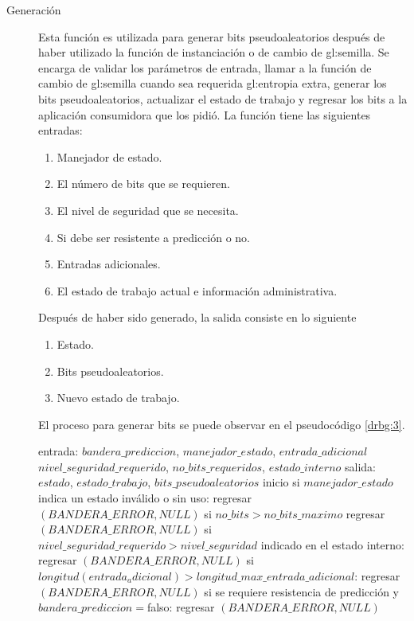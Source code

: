 \begin{description}
  \item [Generación] Esta función es utilizada para generar bits
    pseudoaleatorios después de haber utilizado la función de instanciación o
    de cambio de \gls{gl:semilla}. Se encarga de validar los parámetros de
    entrada, llamar a la función de cambio de \gls{gl:semilla} cuando sea
    requerida \gls{gl:entropia} extra, generar los bits pseudoaleatorios,
    actualizar el estado de trabajo y regresar los bits a la aplicación
    consumidora que los pidió. La función tiene las siguientes entradas:
    \begin{enumerate}
      \item Manejador de estado.
      \item El número de bits que se requieren.
      \item El nivel de seguridad que se necesita.
      \item Si debe ser resistente a predicción o no.
      \item Entradas adicionales.
      \item El estado de trabajo actual e información administrativa.
    \end{enumerate}
    Después de haber sido generado, la salida consiste en lo siguiente
    \begin{enumerate}
      \item Estado.
      \item Bits pseudoaleatorios.
      \item Nuevo estado de trabajo.
    \end{enumerate}
    El proceso para generar bits se puede observar en el pseudocódigo
    \ref{drbg:3}.
\begin{pseudocodigo}[caption={DRBG, generación.}, label={drbg:3}]
    entrada:  $bandera\_prediccion$, $manejador\_estado$, $entrada\_adicional$
              $nivel\_seguridad\_requerido$, $no\_bits\_requeridos$, $estado\_interno$
    salida:   $estado$, $estado\_trabajo$, $bits\_pseudoaleatorios$
    inicio
      si $manejador\_estado$ indica un estado inválido o sin uso:
        regresar $(BANDERA\_ERROR, NULL)$
      si $no\_bits > no\_bits\_maximo$
        regresar $(BANDERA\_ERROR, NULL)$
      si $nivel\_seguridad\_requerido > nivel\_seguridad$ indicado en el estado interno:
        regresar $(BANDERA\_ERROR, NULL)$
      si $longitud(entrada_adicional) > longitud\_max\_entrada\_adicional$:
        regresar $(BANDERA\_ERROR, NULL)$
      si se requiere resistencia de predicción y $bandera\_prediccion=$falso:
        regresar $(BANDERA\_ERROR, NULL)$

\end{pseudocodigo}
\end{description}
